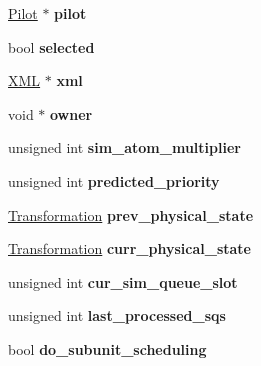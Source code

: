 \begin{DoxyCompactItemize}
\item 
\hyperlink{classPilot}{Pilot} $\ast$ {\bfseries pilot}\hypertarget{classUnit_a05f9a688f7e0a5db2f98cace33c90553}{}\label{classUnit_a05f9a688f7e0a5db2f98cace33c90553}

\item 
bool {\bfseries selected}\hypertarget{classUnit_a392344ee0fb543ca0f9e9ef364f2597d}{}\label{classUnit_a392344ee0fb543ca0f9e9ef364f2597d}

\item 
\hyperlink{structUnit_1_1XML}{X\+ML} $\ast$ {\bfseries xml}\hypertarget{classUnit_a2dbcffa4460264a26fce5deb017b9480}{}\label{classUnit_a2dbcffa4460264a26fce5deb017b9480}

\item 
void $\ast$ {\bfseries owner}\hypertarget{classUnit_a79a19b21ad55b6856ed8504fb350b13d}{}\label{classUnit_a79a19b21ad55b6856ed8504fb350b13d}

\item 
unsigned int {\bfseries sim\+\_\+atom\+\_\+multiplier}\hypertarget{classUnit_a97dfc5bd1f2afd63bfef6423f0d71097}{}\label{classUnit_a97dfc5bd1f2afd63bfef6423f0d71097}

\item 
unsigned int {\bfseries predicted\+\_\+priority}\hypertarget{classUnit_a4e6c9bbc3c52833b8c3b246b11438b72}{}\label{classUnit_a4e6c9bbc3c52833b8c3b246b11438b72}

\item 
\hyperlink{structTransformation}{Transformation} {\bfseries prev\+\_\+physical\+\_\+state}\hypertarget{classUnit_ac9debacd3f87a7d18e0afc5f55e83c47}{}\label{classUnit_ac9debacd3f87a7d18e0afc5f55e83c47}

\item 
\hyperlink{structTransformation}{Transformation} {\bfseries curr\+\_\+physical\+\_\+state}\hypertarget{classUnit_ae4dbc4d247f0f722ca86d69116879d1d}{}\label{classUnit_ae4dbc4d247f0f722ca86d69116879d1d}

\item 
unsigned int {\bfseries cur\+\_\+sim\+\_\+queue\+\_\+slot}\hypertarget{classUnit_adae3e39dd762bb6f9a5eb4323d6680b3}{}\label{classUnit_adae3e39dd762bb6f9a5eb4323d6680b3}

\item 
unsigned int {\bfseries last\+\_\+processed\+\_\+sqs}\hypertarget{classUnit_ae2a7a015e87fa5a6e3abdfa424e5ec81}{}\label{classUnit_ae2a7a015e87fa5a6e3abdfa424e5ec81}

\item 
bool {\bfseries do\+\_\+subunit\+\_\+scheduling}\hypertarget{classUnit_a59b014aea0bc6811a281155ec68d9d60}{}\label{classUnit_a59b014aea0bc6811a281155ec68d9d60}


\end{DoxyCompactItemize}

